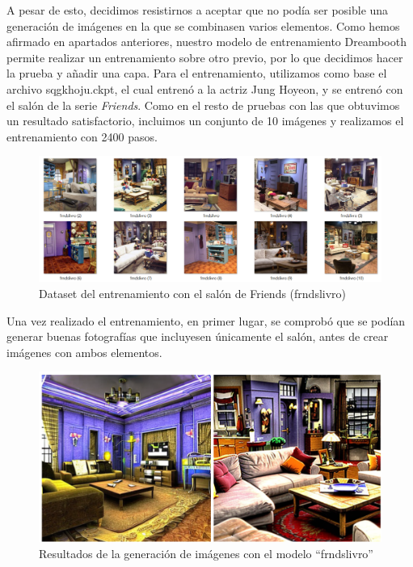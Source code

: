 A pesar de esto, decidimos resistirnos a aceptar que no podía ser posible una generación de imágenes en la que se combinasen varios elementos. Como hemos afirmado en apartados anteriores, nuestro modelo de entrenamiento Dreambooth permite realizar un entrenamiento sobre otro previo, por lo que decidimos hacer la prueba y añadir una capa. Para el entrenamiento, utilizamos como base el archivo sqgkhoju.ckpt, el cual entrenó a la actriz Jung Hoyeon, y se entrenó con el salón de la serie \textit{Friends}. Como en el resto de pruebas con las que obtuvimos un resultado satisfactorio, incluimos un conjunto de 10 imágenes y realizamos el entrenamiento con 2400 pasos.\\

\begin{figure}[!htb]
	\centering
	\includegraphics[width = 1
	\textwidth]{Imagenes/Vectorial/dataset_frdslivro.png}
	\caption{Dataset del entrenamiento con el salón de Friends (frndslivro)}
	\label{fig:dataset_frdslivro}
\end{figure}


Una vez realizado el entrenamiento, en primer lugar, se comprobó que se podían generar buenas fotografías que incluyesen únicamente el salón, antes de crear imágenes con ambos elementos.\\

\begin{figure}[!htb]
	\centering
	\includegraphics[width = 1
	\textwidth]{Imagenes/Vectorial/resultadosfrndslivro.png}
	\caption{Resultados de la generación de imágenes con el modelo ``frndslivro''}
	\label{fig:resultsfrnds}
\end{figure}

